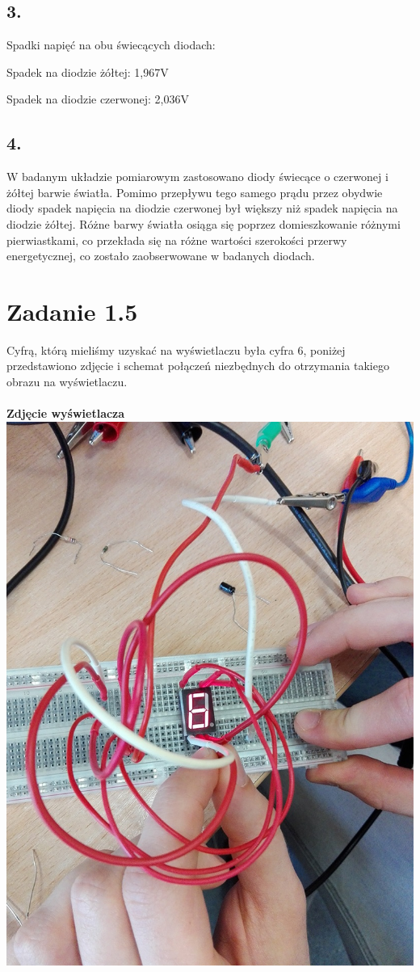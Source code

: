 \documentclass[polish,a4paper]{article}
\begin{document}
\subsection*{3.} Spadki napięć na obu świecących diodach:

Spadek na diodzie żółtej: 1,967V
\newline

Spadek na diodzie czerwonej: 2,036V
\newline


\subsection*{4.}
W badanym układzie pomiarowym zastosowano diody świecące o czerwonej i żółtej barwie światła. Pomimo przepływu tego samego prądu przez obydwie diody spadek napięcia na diodzie czerwonej był większy niż spadek napięcia na diodzie żółtej. Różne barwy światła osiąga się poprzez domieszkowanie różnymi pierwiastkami, co przekłada się na różne wartości szerokości przerwy energetycznej, co zostało zaobserwowane w badanych diodach.

\section{Zadanie 1.5}
Cyfrą, którą mieliśmy uzyskać na wyświetlaczu była cyfra 6, poniżej przedstawiono zdjęcie i schemat połączeń niezbędnych do otrzymania takiego obrazu na wyświetlaczu.\\
\\
\textbf{Zdjęcie wyświetlacza}\\
\includegraphics[width=\textwidth]{cyfra2}
\end{document}
